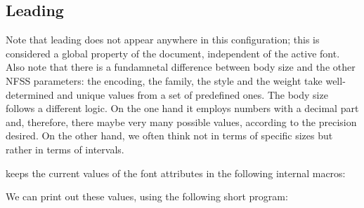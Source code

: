 \begin{multicols}{2}


\section*{Leading}

Note that leading does not appear anywhere in this configuration; this is considered a global property of the document, independent of the active font. Also note that there is a fundamnetal difference between body size and the other NFSS parameters: the encoding, the family, the style and the weight take well-determined and unique values from a set of predefined ones. The body size follows a different logic. On the one hand it employs numbers with a decimal part and, therefore, there maybe very many possible values, according to the precision desired. On the other hand, we often think not in terms of specific sizes but rather in terms of intervals.



\latex keeps the current values of the font attributes in the following internal macros:

\begin{teX}
\f@encoding 
\f@family 
\f@series 
\f@shape 
\f@size 
\f@baselineskip 
\tf@size 
\sf@size 
\ssf@size
\end{teX}

We can print out these values, using the following short program:


\end{multicols}
